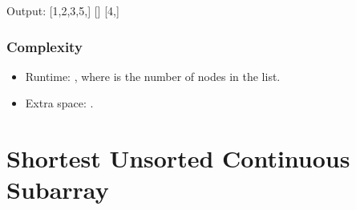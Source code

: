 \documentclass[letterpaper,12pt,english]{book}
\begin{document}
\begin{sphinxVerbatim}[commandchars=\\\{\}]
\end{sphinxVerbatim}

\begin{sphinxVerbatim}[commandchars=\\\{\}]
Output:
[1,2,3,5,]
[]
[4,]
\end{sphinxVerbatim}


\subsubsection{Complexity}
\label{\detokenize{Two_Pointers/08_TP_19_Remove_Nth_Node_From_End_of_List:id2}}\begin{itemize}
\item {} 
\sphinxAtStartPar
Runtime: , where  is the number of nodes in the list.

\item {} 
\sphinxAtStartPar
Extra space: .

\end{itemize}

\sphinxstepscope


\section{Shortest Unsorted Continuous Subarray}
\label{\detokenize{Two_Pointers/08_TP_581_Shortest_Unsorted_Continuous_Subarray:shortest-unsorted-continuous-subarray}}\label{\detokenize{Two_Pointers/08_TP_581_Shortest_Unsorted_Continuous_Subarray::doc}}
\end{document}
